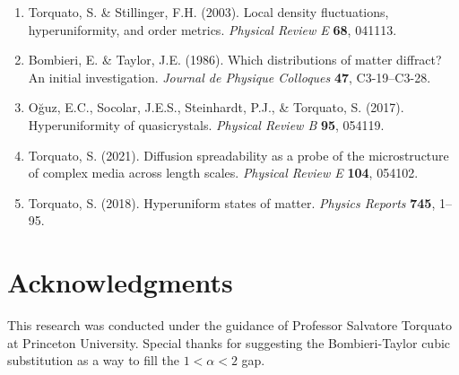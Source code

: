 \documentclass[11pt,letterpaper]{article}
\begin{document}
\begin{enumerate}
    \item Torquato, S. \& Stillinger, F.H. (2003). Local density fluctuations, hyperuniformity, and order metrics. \textit{Physical Review E} \textbf{68}, 041113.

    \item Bombieri, E. \& Taylor, J.E. (1986). Which distributions of matter diffract? An initial investigation. \textit{Journal de Physique Colloques} \textbf{47}, C3-19--C3-28.

    \item O\u{g}uz, E.C., Socolar, J.E.S., Steinhardt, P.J., \& Torquato, S. (2017). Hyperuniformity of quasicrystals. \textit{Physical Review B} \textbf{95}, 054119.

    \item Torquato, S. (2021). Diffusion spreadability as a probe of the microstructure of complex media across length scales. \textit{Physical Review E} \textbf{104}, 054102.

    \item Torquato, S. (2018). Hyperuniform states of matter. \textit{Physics Reports} \textbf{745}, 1--95.
\end{enumerate}

\section*{Acknowledgments}

This research was conducted under the guidance of Professor Salvatore Torquato at Princeton University. Special thanks for suggesting the Bombieri-Taylor cubic substitution as a way to fill the $1 < \alpha < 2$ gap.
\end{document}
